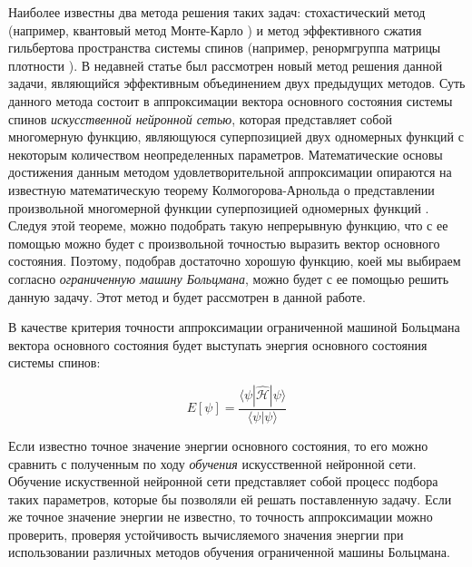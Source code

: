 Наиболее известны два метода решения таких задач: стохастический метод (например, квантовый метод Монте-Карло \cite{ceperley1986quantum}) и метод эффективного сжатия гильбертова пространства системы спинов (например, ренормгруппа матрицы плотности \cite{white1992density}).
В недавней статье \cite{carleo2017solving} был рассмотрен новый метод решения данной задачи, являющийся эффективным объединением двух предыдущих методов. 
Суть данного метода состоит в аппроксимации вектора основного состояния системы спинов \textit{искусственной нейронной сетью}, которая представляет собой многомерную функцию, являющуюся суперпозицией двух одномерных функций с некоторым количеством неопределенных параметров.
Математические основы достижения данным методом удовлетворительной аппроксимации опираются на известную математическую теорему Колмогорова-Арнольда о представлении произвольной многомерной функции суперпозицией одномерных функций \cite{kolmogorov1956representation}.
Следуя этой теореме, можно подобрать такую непрерывную функцию, что с ее помощью можно будет с произвольной точностью выразить вектор основного состояния. 
Поэтому, подобрав достаточно хорошую функцию, коей мы выбираем согласно \cite{carleo2017solving} \textit{ограниченную машину Больцмана}, можно будет с ее помощью решить данную задачу. 
Этот метод и будет рассмотрен в данной работе.

В качестве критерия точности аппроксимации ограниченной машиной Больцмана вектора основного состояния будет выступать энергия основного состояния системы спинов:

\begin{equation*}
E[\psi]=\frac{\langle \psi | \hat{\mathcal{H}} | \psi \rangle}{\langle \psi | \psi \rangle}
\end{equation*}

Если известно точное значение энергии основного состояния, то его можно сравнить с полученным по ходу \textit{обучения} искусственной нейронной сети.
Обучение искуственной нейронной сети представляет собой процесс подбора таких параметров, которые бы позволяли ей решать поставленную задачу.
Если же точное значение энергии не известно, то точность аппроксимации можно проверить, проверяя устойчивость вычисляемого значения энергии  при использовании различных методов обучения ограниченной машины Больцмана.